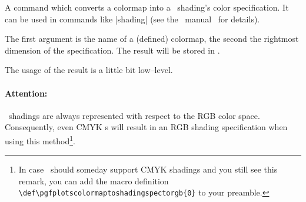 \begin{command}{\pgfplotscolormaptoshadingspec{}}
	A command which converts a colormap into a \PGF\ shading's color specification. It can be used in commands like |\pgfdeclare*shading| (see the \PGF\ manual~\cite{tikz} for details).

	The first argument is the name of a (defined) colormap, the second the rightmost dimension of the specification. The result will be stored in .
\begin{codeexample}[]
	\result
	\def\tempb{\pgfdeclarehorizontalshading{tempshading}{1cm}}%
	\expandafter\tempb\expandafter{\result}%
\end{codeexample}
The usage of the result  is a little bit low--level.

	\paragraph{Attention:} \PGF\ shadings are always represented with respect to the RGB color space. Consequently, even CMYK s will result in an RGB shading specification when using this method\footnote{In case \PGF\ should someday support CMYK shadings and you still see this remark, you can add the macro definition \texttt{\textbackslash def\textbackslash pgfplotscolormaptoshadingspectorgb\{0\}} to your preamble.}.
\end{command}


